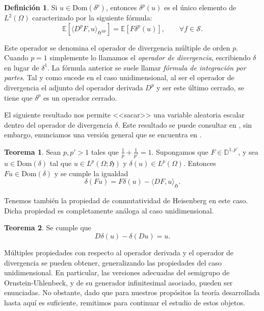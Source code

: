 \documentclass[letterpaper,twoside,12pt]{book}
\newcommand{\D}{\mathbb{D}}
\renewcommand{\S}{\mathcal{S}}
\newcommand{\E}{\mathbb{E}}
\newcommand{\1}{\mathds{1}}
\theoremstyle{definition}
\newtheorem{dfn}{Definición}
\theoremstyle{definition}
\newtheorem{teo}{Teorema}
\theoremstyle{remark}
\theoremstyle{definition}
\theoremstyle{definition}
\theoremstyle{definition}
\theoremstyle{definition}
\theoremstyle{definition}
\begin{document}
 \begin{dfn} 
  Si $u\in \text{Dom}(\delta^p)$, entonces $\delta^p(u)$ es el único elemento de $L^2(\Omega)$ caracterizado por la siguiente fórmula:
\[
 \E\left[\langle D^pF,u\rangle_{\mathfrak{H}^{\otimes p}}\right]=\E\left[F\delta^{p}(u)\right], \qquad \forall f\in \S.
 \]
  \end{dfn}
Este operador se denomina el operador de divergencia múltiple de orden $p$. Cuando $p=1$ simplemente lo llamamos el \textit{operador de divergencia},  escribiendo $\delta$ en lugar de $\delta^1$. La fórmula anterior se suele llamar \textit{fórmula de integración por partes}. Tal y como sucede en el caso unidimensional, al ser el operador de divergencia el adjunto del operador derivada $D^{p}$ y ser este último cerrado, se tiene que $\delta^{p}$ es un operador cerrado.

El siguiente resultado nos permite <<sacar>> una variable aleatoria escalar dentro del operador de divergencia $\delta$. Este resultado se puede consultar en \cite[proposición 2.5.4]{Nourdin_Peccati_2012}, sin embargo, enunciamos una versión general que se encuentra en \cite[lema 1]{Caballero1998-hz}.

\begin{teo}\label{factordeltafuera}
 Sean $p,p'>1$ tales que $\frac{1}{p}+\frac{1}{p'}=1$. Supongamos que $F\in \D^{1,p'}$, y sea $u \in \text{Dom}(\delta)$ tal que $u\in L^{p}(\Omega;\mathfrak{H})$ y $\delta(u)\in L^{p}(\Omega)$. Entonces $Fu\in \text{Dom}(\delta)$ y se cumple la igualdad 
 \begin{equation}\label{eqfactordeltafuera}
   \delta (Fu)=F\delta(u)-\langle DF,u\rangle_{\mathfrak{H}}.
\end{equation}
 
 \end{teo}

 Tenemos también la propiedad de conmutatividad de Heisenberg en este caso. Dicha propiedad es completamente análoga al caso unidimensional.

\begin{teo} 
Se cumple que 
\[
D\delta(u)-\delta(Du)=u.
\]
 \end{teo}

Múltiples propiedades con respecto al operador derivada y el operador de divergencia se pueden obtener, generalizando las propiedades del caso unidimensional. En particular, las versiones adecuadas del semigrupo de Ornstein-Uhlenbeck, y de su generador infinitesimal asociado, pueden ser enunciadas. No obstante, dado que para nuestros propósitos la teoría desarrollada hasta aquí es suficiente, remitimos \cite[capítulo 2]{Nourdin_Peccati_2012} para continuar el estudio de estos objetos. 
\end{document}
